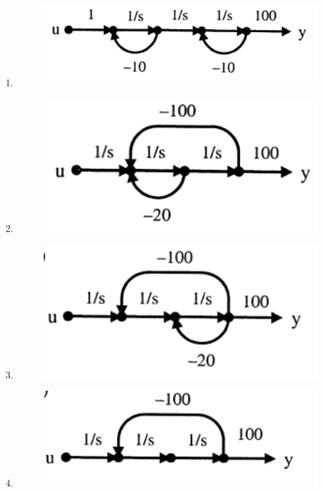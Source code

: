 \documentclass[a4paper, 11pt]{article}
\begin{document}
\begin{enumerate}
    \begin{enumerate}
        \item \begin{figure}[H]\centering\includegraphics[width=0.7\columnwidth]{figs/q50A.png}\caption*{}\label{fig:a50A}\end{figure}
        \item \begin{figure}[H]\centering\includegraphics[width=0.7\columnwidth]{figs/q50B.png}\caption*{}\label{fig:a50B}\end{figure}
        \item \begin{figure}[H]\centering\includegraphics[width=0.7\columnwidth]{figs/q50C.png}\caption*{}\label{fig:a50C}\end{figure}
        \item \begin{figure}[H]\centering\includegraphics[width=0.7\columnwidth]{figs/q50D.png}\caption*{}\label{fig:a50D}\end{figure}
    \end{enumerate}
    

\end{enumerate}
\end{document}
